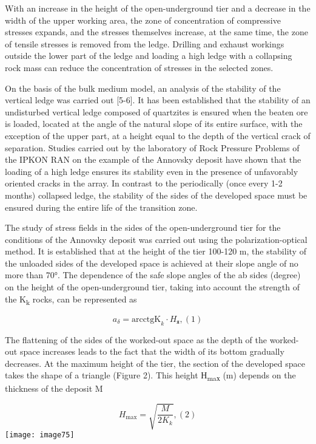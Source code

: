 \begin{multicols}{2}
With an increase in the height of the open-underground tier and a
decrease in the width of the upper working area, the zone of
concentration of compressive stresses expands, and the stresses
themselves increase, at the same time, the zone of tensile stresses is
removed from the ledge. Drilling and exhaust workings outside the lower
part of the ledge and loading a high ledge with a collapsing rock mass
can reduce the concentration of stresses in the selected zones.

On the basis of the bulk medium model, an analysis of the stability of
the vertical ledge was carried out {[}5-6{]}. It has been established
that the stability of an undisturbed vertical ledge composed of
quartzites is ensured when the beaten ore is loaded, located at the
angle of the natural slope of its entire surface, with the exception of
the upper part, at a height equal to the depth of the vertical crack of
separation. Studies carried out by the laboratory of Rock Pressure
Problems of the IPKON RAN on the example of the Annovsky deposit have
shown that the loading of a high ledge ensures its stability even in the
presence of unfavorably oriented cracks in the array. In contrast to the
periodically (once every 1-2 months) collapsed ledge, the stability of
the sides of the developed space must be ensured during the entire life
of the transition zone.

The study of stress fields in the sides of the open-underground tier for
the conditions of the Annovsky deposit was carried out using the
polarization-optical method. It is established that at the height of the
tier 100-120 m, the stability of the unloaded sides of the developed
space is achieved at their slope angle of no more than 70°. The
dependence of the safe slope angles of the ab sides (degree) on the
height of the open-underground tier, taking into account the strength of
the K\textsubscript{k} rocks, can be represented as

\[a_{\delta} = \text{arcctgK}_{k} \cdot H_{\text{я}},(1)\]

The flattening of the sides of the worked-out space as the depth of the
worked-out space increases leads to the fact that the width of its
bottom gradually decreases. At the maximum height of the tier, the
section of the developed space takes the shape of a triangle (Figure 2).
This height Н\textsubscript{maх} (m) depends on the thickness of the
deposit M

\[H_{\text{max}} = \sqrt{\frac{M}{2K_{k}}},(2)\]
{    \centering
    \texttt{[image: image75]}
    }


\end{multicols}
